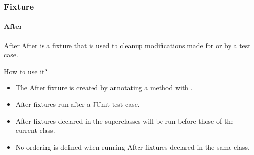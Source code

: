 \begin{frame}[parent={concept:fixture}, hasprev=false, hasnext=false]
\frametitle{Fixture}
\framesubtitle{After}
\label{concept:junit-after-fixture}
\label{concept:after-fixture}
\label{concept:after}

\begin{block:concept}{After}
After is a fixture that is used to cleanup modifications made for or
by a test case.
\end{block:concept}

\begin{block:fact}{How to use it?}
\begin{itemize}
	\item The After fixture is created by annotating a method with
	.

	\item After fixtures run after a JUnit test case.

	\item After fixtures declared in the superclasses will be run before those
	of the current class.

	\item No ordering is defined when running After fixtures declared in the
	same class.
\end{itemize}
\end{block:fact}
\end{frame}